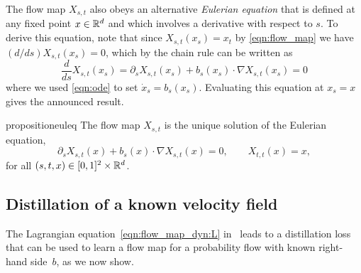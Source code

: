 The flow map $X_{s, t}$ also obeys an alternative \emph{Eulerian equation} that is defined at any fixed point $x \in \mathbb{R}^d$ and which involves a derivative with respect to $s$. To derive this equation, note that since $X_{s,t}(x_s) = x_t$ by \eqref{eqn:flow_map} we have $(d/ds)X_{s,t}(x_s) =0$, which by the chain rule can be written as
%
\begin{equation}
	\label{eqn:backward:2}
	\frac{d}{ds} X_{s,t} (x_s) = \partial_s X_{s, t}(x_s) + b_s(x_s)\cdot \nabla X_{s, t}(x_s) = 0
\end{equation}
%
where we used \cref{eqn:ode} to set $\dot x_s = b_s(x_s)$.
Evaluating this equation at $x_s=x$ gives the announced result.
\begin{restatable}{proposition}{euleq}
	\label{prop:prop_backwards}
	The flow map $X_{s, t}$ is the unique solution of the Eulerian equation,
	\begin{equation}
		\label{eqn:backward}
		\partial_s X_{s, t}(x) + b_s(x)\cdot \nabla X_{s, t}(x) = 0, \qquad X_{t,t} (x) = x,
	\end{equation}
	for all $(s,t,x) \in [0,1]^2\times \mathbb{R}^d$.
\end{restatable}
%
\subsection{Distillation of a known velocity field}
\label{ssec:distill}
%
The Lagrangian equation~\eqref{eqn:flow_map_dyn:L} in~ leads to a distillation loss that can be used to learn a flow map for a probability flow with known right-hand side~$b$, as we now show.

